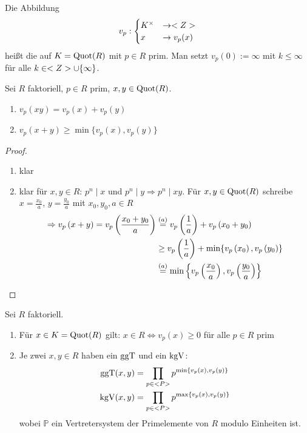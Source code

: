 \begin{definition}
	Die Abbildung
	\begin{align}
		v_p: \begin{cases}
		K^{\times} &\to <Z>\\
		x &\to v_p(x)
		\end{cases}\notag
	\end{align}
	heißt die  auf $K=\operatorname{Quot}(R)$ mit $p\in R$ prim. Man setzt $v_p(0) := \infty$ mit $k \le \infty$ für alle $k \in <Z> \cup \{\infty\}$.
\end{definition}

\begin{lemma}
	Sei $R$ faktoriell, $p \in R$ prim, $x,y \in \operatorname{Quot}(R)$.
	\begin{enumerate}[label=(\alph*)]
		\item $v_p(xy) = v_p(x) + v_p(y)$
		\item $v_p(x+y) \ge \min \{v_p(x), v_p(y)\}$
	\end{enumerate}
\end{lemma}

\begin{proof}
	\begin{enumerate}[label=(\alph*)]
		\item klar
		\item klar für $x,y \in R$: $p^n \mid x$ und $p^n \mid y \Rightarrow p^n \mid xy$. Für $x,y \in \operatorname{Quot}(R)$ schreibe $x = \frac{x_0}{a}$, $y = \frac{y_0}{a}$ mit $x_0, y_0, a \in R$
		\begin{align}
		\Rightarrow v_p\left(x+y\right) = v_p\left(\frac{x_0+y_0}{a}\right) 
		&\overset{(a)}{=} v_p\left(\frac{1}{a}\right) + v_p\left(x_0 + y_0\right) \notag \\
		&\ge v_p\left(\frac{1}{a}\right) + \min\{v_p\left(x_0\right), v_p\left(y_0\right)\}\notag \\
		&\overset{(a)}{=} \min\left\lbrace v_p\left(\frac{x_0}{a}\right), v_p\left(\frac{y_0}{a}\right)\right\rbrace \notag
		\end{align}
		\end{enumerate}
\end{proof}

\begin{remark}
	Sei $R$ faktoriell.
	\begin{enumerate}[label=(\alph*)]
		\item Für $x \in K = \operatorname{Quot}(R)$ gilt: $x \in R \Leftrightarrow v_p(x) \ge 0$ für alle $p \in R$ prim
		\item Je zwei $x,y \in R$ haben ein $\operatorname{ggT}$ und ein $\operatorname{kgV}$:
		\begin{align}
		\operatorname{ggT}(x,y) &= \prod_{p\in <P>} p^{\min\{v_p(x), v_p(y)\}} \notag \\
		\operatorname{kgV}(x,y) &= \prod_{p\in <P>} p^{\max\{v_p(x), v_p(y)\}} \notag
		\end{align}
		wobei $\mathbb{P}$ ein Vertretersystem der Primelemente von $R$ modulo Einheiten ist. 
	\end{enumerate}
\end{remark}

